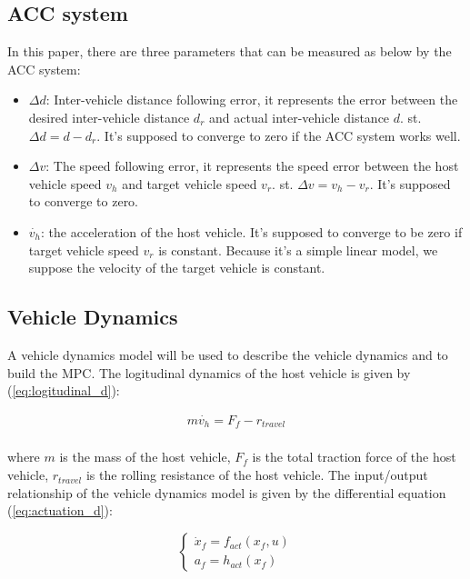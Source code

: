 \documentclass{article}
\numberwithin{equation}{section}
\begin{document}
\subsection{ACC system}
In this paper, there are three parameters that can be measured as below by the
ACC system:
\begin{itemize}
    \item $\Delta d$: Inter-vehicle distance following error, it represents the error between the
          desired inter-vehicle distance $d_r$ and actual inter-vehicle distance $d$. st. $\Delta d=d-d_r$.
          It's supposed to converge to zero if the ACC system works well.
    \item $\Delta v$: The speed following error, it represents the speed error between the
          host vehicle speed $v_h$ and target vehicle speed $v_r$. st. $\Delta v=v_h-v_r$.
          It's supposed to converge to zero.
    \item $\dot{v_h}$: the acceleration of the host vehicle. It's supposed to converge to
          be zero if target vehicle speed $v_r$ is constant. Because it's a simple linear model, we
          suppose the velocity of the target vehicle is constant.
\end{itemize}
\subsection{Vehicle Dynamics}
A vehicle dynamics model\cite{Takahama} will be used to describe the vehicle
dynamics and to build the MPC. The logitudinal dynamics of the host vehicle is
given by (\ref{eq:logitudinal_d}):

\begin{equation}
    \begin{aligned}
        m\dot{v_h}=F_f-r_{travel}\label{eq:logitudinal_d} \\
    \end{aligned}
\end{equation}

\noindent where $m$ is the mass of the host vehicle, $F_f$ is the total traction force of the host vehicle,
$r_{travel}$ is the rolling resistance of the host vehicle. The input/output relationship of
the vehicle dynamics model is given by the differential equation (\ref{eq:actuation_d}):

\begin{equation}
    \left\{\begin{array}{l}\label{eq:actuation_d}
        \dot{x}_{f}=f_{a c t}\left(x_{f}, u\right) \\
        a_{f}=h_{a c t}\left(x_{f}\right)
    \end{array}\right.
\end{equation}
\end{document}

